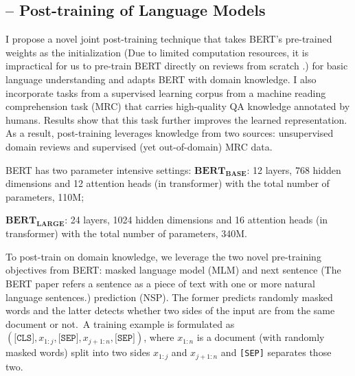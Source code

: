 \subsection{-- Post-training of Language Models}
\label{chap4:sec:post-training}

I propose a novel joint post-training technique that takes BERT's pre-trained weights as the initialization (Due to limited computation resources, it is impractical for us to pre-train BERT directly on reviews from scratch \cite{devlin2018bert}.) for basic language understanding and adapts BERT with domain knowledge.
I also incorporate tasks from a supervised learning corpus from a machine reading comprehension task (MRC) that carries high-quality QA knowledge annotated by humans.
Results show that this task further improves the learned representation.
As a result, post-training leverages knowledge from two sources: unsupervised domain reviews and supervised (yet out-of-domain) MRC data.

BERT has two parameter intensive settings:
\noindent
$\textbf{BERT}_\textbf{BASE}$: 12 layers, 768 hidden dimensions and 12 attention heads (in transformer) with the total number of parameters, 110M;

\noindent
$\textbf{BERT}_\textbf{LARGE}$: 24 layers, 1024 hidden dimensions and 16 attention heads (in transformer) with the total number of parameters, 340M.


To post-train on domain knowledge, we leverage the two novel pre-training objectives from BERT: masked language model (MLM) and next sentence (The BERT paper refers a sentence as a piece of text with one or more natural language sentences.) prediction (NSP). The former predicts randomly masked words and the latter detects whether two sides of the input are from the same document or not.~A training example is formulated as $(\texttt{[CLS]}, x_{1:j}, \texttt{[SEP]}, x_{j+1:n}, \texttt{[SEP]})$, where $x_{1:n}$ is a document (with randomly masked words) split into two sides $x_{1:j}$ and $x_{j+1:n}$ and \texttt{[SEP]} separates those two.

